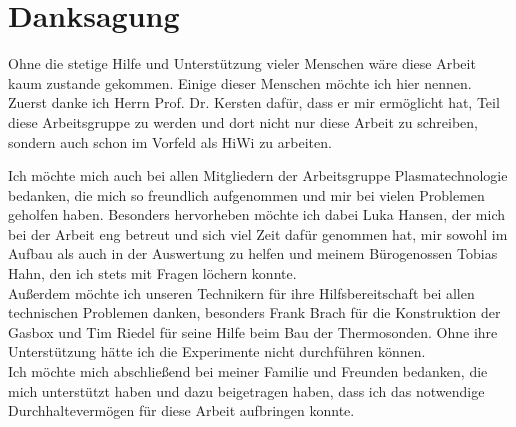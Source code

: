 \chapter*{Danksagung}

Ohne die stetige Hilfe und Unterstützung vieler Menschen wäre diese Arbeit kaum zustande gekommen. Einige dieser Menschen möchte ich hier nennen.\\

Zuerst danke ich Herrn Prof. Dr. Kersten dafür, dass er mir ermöglicht hat, Teil diese Arbeitsgruppe zu werden und dort nicht nur diese Arbeit zu schreiben, sondern auch schon im Vorfeld als HiWi zu arbeiten.

Ich möchte mich auch bei allen Mitgliedern der Arbeitsgruppe Plasmatechnologie bedanken, die mich so freundlich aufgenommen und mir bei vielen Problemen geholfen haben. Besonders hervorheben möchte ich dabei Luka Hansen, der mich bei der Arbeit eng betreut und sich viel Zeit dafür genommen hat, mir sowohl im Aufbau als auch in der Auswertung zu helfen und meinem Bürogenossen Tobias Hahn, den ich stets mit Fragen löchern konnte.\\

Außerdem möchte ich unseren Technikern für ihre Hilfsbereitschaft bei allen technischen Problemen danken, besonders Frank Brach für die Konstruktion der Gasbox und Tim Riedel für seine Hilfe beim Bau der Thermosonden. Ohne ihre Unterstützung hätte ich die Experimente nicht durchführen können.\\

Ich möchte mich abschließend bei meiner Familie und Freunden bedanken, die mich unterstützt haben und dazu beigetragen haben, dass ich das notwendige Durchhaltevermögen für diese Arbeit aufbringen konnte.